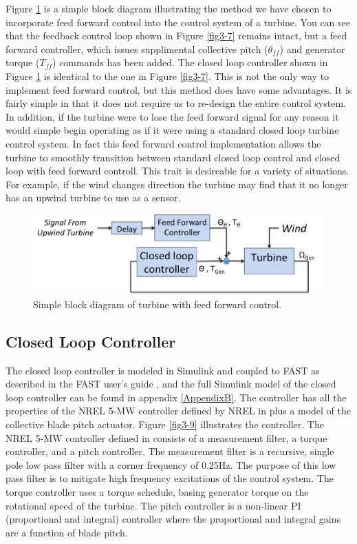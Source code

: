 Figure \ref{fig3-8} is a simple block diagram illustrating the method we have chosen  to incorporate feed forward control into the control system of a turbine. You can see that the feedback control loop shown in Figure \ref{fig3-7} remains intact, but a feed forward controller, which issues supplimental collective pitch ($\theta_{ff}$) and generator torque ($T_{ff}$) commands has been added. The closed loop controller shown in Figure \ref{fig3-8} is identical to the one in Figure \ref{fig3-7}. This is not the only way to implement feed forward control, but this method does have some advantages. It is fairly simple in that it does not require us to re-design the entire control system. In addition, if the turbine were to lose the feed forward signal for any reason it would simple begin operating as if it were using a standard closed loop turbine control system. In fact this feed forward control implementation allows the turbine to smoothly transition between standard closed loop control and closed loop with feed forward controll. This trait is desireable for a variety of situations. For example, if the wind changes direction the turbine may find that it no longer has an upwind turbine to use as a sensor.

 \begin{figure}[htbp]
	\centering
		\includegraphics[width=\linewidth]{Figures/ch3Figures/fig3-8.png}
		
	\caption{Simple block diagram of turbine with feed forward control.}
	\label{fig3-8}
\end{figure}

\subsection{Closed Loop Controller}

The closed loop controller is modeled in Simulink and coupled to FAST as described in the FAST user's guide \cite{jonkman2005}, and the full Simulink model of the closed loop controller can be found in appendix \ref{AppendixB}. The controller has all the properties of the NREL 5-MW controller defined by NREL in \cite{jonkman2009} plus a model of the collective blade pitch actuator.  Figure \ref{fig3-9} illustrates the controller. The NREL 5-MW controller defined in \cite{jonkman2009} consists of a measurement filter, a torque controller, and a pitch controller. The measurement filter is a recursive, single pole low pass filter with a corner frequency of 0.25Hz. The purpose of this low pass filter is to mitigate high frequency excitations of the control system. The torque controller uses a torque schedule, basing generator torque on the rotational speed of the turbine. The pitch controller is a non-linear PI (proportional and integral) controller where the proportional and integral gains are a function of blade pitch. 

